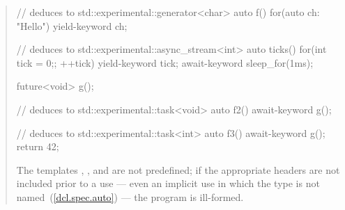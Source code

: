 \begin{quote}
\begin{itemize}
\end{itemize}
\enterexample
\begin{codeblock}
// deduces to std::experimental::generator<char>
auto f() { for(auto ch: "Hello") yield-keyword ch; }

// deduces to std::experimental::async_stream<int>
auto ticks() {
  for(int tick = 0;; ++tick) {
    yield-keyword tick;
    await-keyword sleep_for(1ms);
  }
}

future<void> g();

// deduces to std::experimental::task<void>
auto f2() {  await-keyword g(); }


// deduces to std::experimental::task<int>
auto f3() {  
  await-keyword g();
  return 42;
}

\end{codeblock}
\exitexample

\pnum
The templates  , 
, and \linebreak
{} are not predefined;
if the appropriate headers are not included prior to a use --- even an implicit use in which the type is not
named~(\ref{dcl.spec.auto}) --- the program is ill-formed.
\end{quote}
